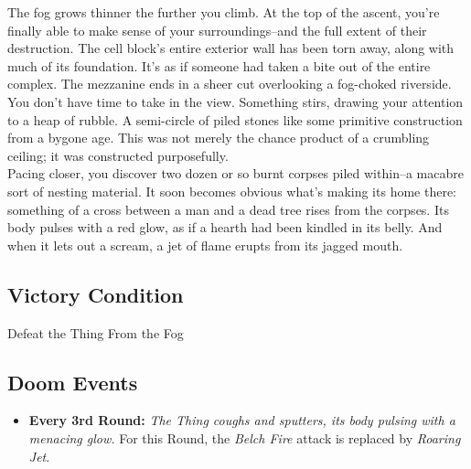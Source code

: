 The fog grows thinner the further you climb. At the top of the ascent, you’re finally able to make sense of your surroundings--and the full extent of their destruction. The cell block's entire exterior wall has been torn away, along with much of its foundation. It's as if someone had taken a bite out of the entire complex. The mezzanine ends in a sheer cut overlooking a fog-choked riverside.\\

You don’t have time to take in the view. Something stirs, drawing your attention to a heap of rubble. A semi-circle of piled stones like some primitive construction from a bygone age. This was not merely the chance product of a crumbling ceiling; it was constructed purposefully.\\

Pacing closer, you discover two dozen or so burnt corpses piled within--a macabre sort of nesting material. It soon becomes obvious what’s making its home there: something of a cross between a man and a dead tree rises from the corpses. Its body pulses with a red glow, as if a hearth had been kindled in its belly. And when it lets out a scream, a jet of flame erupts from its jagged mouth.

\subsection*{Victory Condition}
Defeat the Thing From the Fog

\begin{tcolorbox}
\subsection*{Doom Events}
\begin{itemize}
\item \textbf{Every 3rd Round:} \emph{The Thing coughs and sputters, its body pulsing with a menacing glow.} For this Round, the \emph{Belch Fire} attack is replaced by \emph{Roaring Jet}.
\end{itemize}
\end{tcolorbox}

